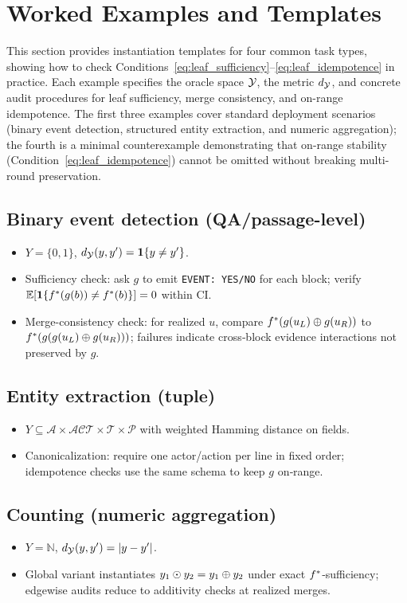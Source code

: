 \section{Worked Examples and Templates}
\label{sec:examples}

This section provides instantiation templates for four common task types, showing how to check Conditions~\eqref{eq:leaf_sufficiency}--\eqref{eq:leaf_idempotence} in practice. Each example specifies the oracle space $\mathcal{Y}$, the metric $d_{\mathcal{Y}}$, and concrete audit procedures for leaf sufficiency, merge consistency, and on-range idempotence. The first three examples cover standard deployment scenarios (binary event detection, structured entity extraction, and numeric aggregation); the fourth is a minimal counterexample demonstrating that on-range stability (Condition~\eqref{eq:leaf_idempotence}) cannot be omitted without breaking multi-round preservation.

\subsection{Binary event detection (QA/passage-level)}
\begin{itemize}
  \item $Y=\{0,1\}$, $d_{\mathcal{Y}}(y,y')=\mathbf 1\{y\neq y'\}$.
  \item Sufficiency check: ask $g$ to emit \texttt{EVENT: YES/NO} for each block; verify $\mathbb{E}[\mathbf 1\{f^{\ast}(g(b))\neq f^{\ast}(b)\}]=0$ within CI.
  \item Merge-consistency check: for realized $u$, compare $f^{\ast}(g(u_L)\oplus g(u_R))$ to $f^{\ast}(g(g(u_L)\oplus g(u_R)))$; failures indicate cross‑block evidence interactions not preserved by $g$.
\end{itemize}

\subsection{Entity extraction (tuple)}
\begin{itemize}
  \item $Y\subseteq\mathcal A\times\mathcal{ACT}\times\mathcal T\times\mathcal P$ with weighted Hamming distance on fields.
  \item Canonicalization: require one actor/action per line in fixed order; idempotence checks use the same schema to keep $g$ on‑range.
\end{itemize}

\subsection{Counting (numeric aggregation)}
\begin{itemize}
  \item $Y=\mathbb N$, $d_{\mathcal{Y}}(y,y')=|y-y'|$.
  \item Global variant instantiates $y_1\odot y_2=y_1\oplus y_2$ under exact $f^{\ast}$‑sufficiency; edgewise audits reduce to additivity checks at realized merges.
\end{itemize}

